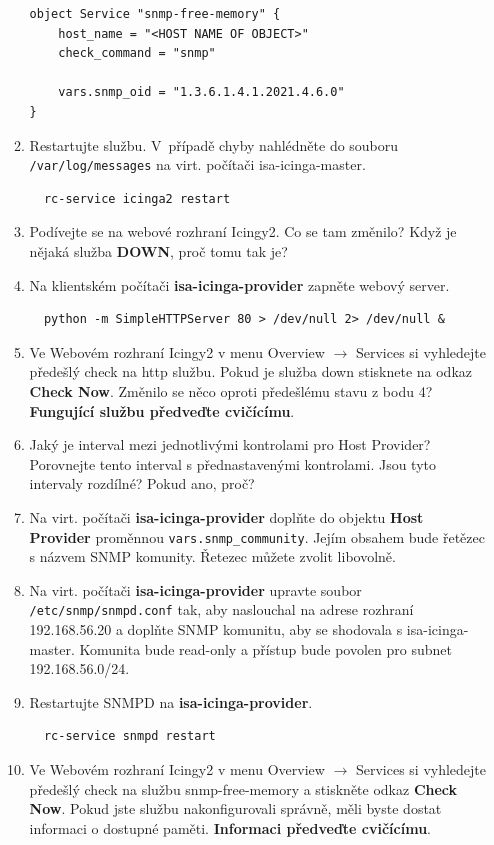 \begin{itemize}
\begin{enumerate}
\begin{verbatim}
object Service "snmp-free-memory" {
    host_name = "<HOST NAME OF OBJECT>"
    check_command = "snmp"
    
    vars.snmp_oid = "1.3.6.1.4.1.2021.4.6.0"
}

\end{verbatim} 
            \item Restartujte službu. V~případě chyby nahlédněte do souboru {\tt /var/log/messages} na virt. počítači isa-icinga-master.
\begin{verbatim}
  rc-service icinga2 restart
\end{verbatim} 
          \item Podívejte se na webové rozhraní Icingy2. Co se tam změnilo? 
          Když je nějaká služba {\bf DOWN}, proč tomu tak je?

          \item Na klientském počítači {\bf isa-icinga-provider} zapněte webový server.
\begin{verbatim}
  python -m SimpleHTTPServer 80 > /dev/null 2> /dev/null &
\end{verbatim}
          \item Ve Webovém rozhraní Icingy2 v menu Overview $\rightarrow$ Services si vyhledejte předešlý check na http službu. Pokud je služba down stisknete na odkaz {\bf Check Now}. Změnilo se něco oproti předešlému stavu z bodu 4? {\bf Fungující službu předveďte cvičícímu}.

          \item Jaký je interval mezi jednotlivými kontrolami pro Host Provider? Porovnejte tento interval s přednastavenými kontrolami. Jsou tyto intervaly rozdílné? Pokud ano, proč?
          
          \item Na virt. počítači {\bf isa-icinga-provider} doplňte do objektu {\bf Host Provider} proměnnou {\tt vars.snmp\_community}. Jejím 
          obsahem bude řetězec s názvem SNMP komunity. Řetezec můžete zvolit libovolně.

          \item Na virt. počítači {\bf isa-icinga-provider} upravte soubor {\tt /etc/snmp/snmpd.conf} tak, aby naslouchal na adrese rozhraní 192.168.56.20 a doplňte SNMP komunitu, aby se shodovala s isa-icinga-master. Komunita bude read-only
          a přístup bude povolen pro subnet 192.168.56.0/24.
          
          \item Restartujte SNMPD na {\bf isa-icinga-provider}.
\begin{verbatim}
  rc-service snmpd restart
\end{verbatim}
          \item Ve Webovém rozhraní Icingy2 v menu Overview $\rightarrow$ Services si vyhledejte předešlý check na službu snmp-free-memory a stiskněte odkaz {\bf Check Now}. Pokud jste službu nakonfigurovali správně, měli byste dostat informaci o dostupné paměti. {\bf Informaci předveďte cvičícímu}.
          
\end{enumerate}
\end{itemize}

